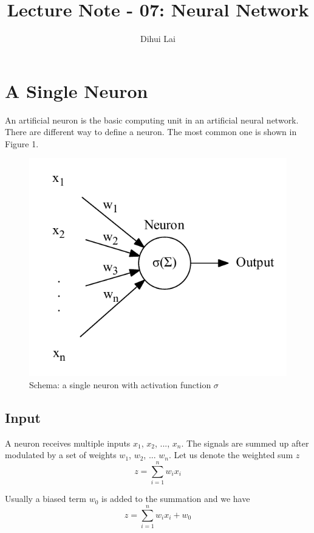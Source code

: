 \documentclass[12pt, oneside]{article}
\title{Lecture Note - 07: Neural Network}
\author{Dihui Lai}
\begin{document}
\maketitle
\tableofcontents

\vspace{.25in}

\section{A Single Neuron}

An artificial neuron is the basic computing unit in an artificial neural network. There are different way to define a neuron. The most common one is shown in Figure 1.
\begin{figure}
\center
\includegraphics[scale=0.6,page=1]{Figures/singleneuron.pdf}
\caption{Schema: a single neuron with activation function $\sigma$}
\end{figure}

\subsection{Input}
A neuron receives multiple inputs $x_1$, $x_2$, ..., $x_n$. The signals are summed up after modulated by a set of weights $w_1$, $w_2$, ... $w_n$. Let us denote the weighted sum $z$
\begin{equation}
z=\sum\limits_{i=1}^{n}w_i x_i
\end{equation}

Usually a biased term $w_0$ is added to the summation and we have 
\begin{equation}
z=\sum\limits_{i=1}^{n}w_i x_i+w_0
\end{equation}
\end{document}
